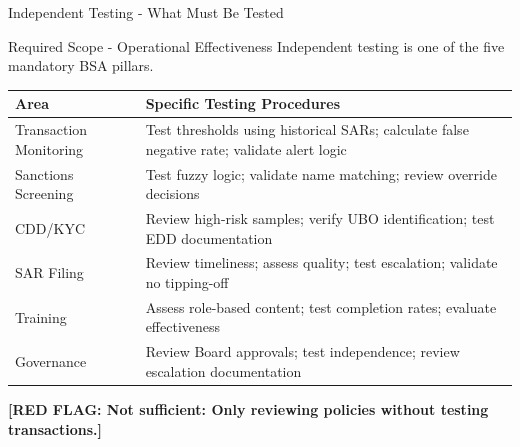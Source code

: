 \documentclass[11pt,a4paper]{beamer}
\newcommand{\redflag}[1]{\textcolor{red!80!black}{\textbf{[RED FLAG: #1]}}}
\begin{document}
	\begin{frame}{Independent Testing - What Must Be Tested}
		\begin{block}{Required Scope - Operational Effectiveness}
			Independent testing is one of the five mandatory BSA pillars.
		\end{block}
		\begin{tabular}{p{}|p{}}
			\hline
			\rowcolor{lightgray}
			\textbf{Area} & \textbf{Specific Testing Procedures} \\
			\hline
			Transaction Monitoring & Test thresholds using historical SARs; calculate false negative rate; validate alert logic \\
			\hline
			Sanctions Screening & Test fuzzy logic; validate name matching; review override decisions \\
			\hline
			CDD/KYC & Review high-risk samples; verify UBO identification; test EDD documentation \\
			\hline
			SAR Filing & Review timeliness; assess quality; test escalation; validate no tipping-off \\
			\hline
			Training & Assess role-based content; test completion rates; evaluate effectiveness \\
			\hline
			Governance & Review Board approvals; test independence; review escalation documentation \\
			\hline
		\end{tabular}
		\redflag{Not sufficient: Only reviewing policies without testing transactions.}
	\end{frame}
	
\end{document}
